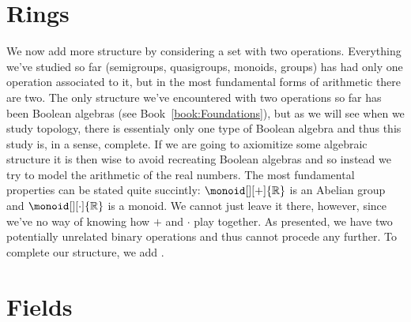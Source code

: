 \begingroup
    \ifcsname\PATH\endcsname
        \newcommand{\PATH}{books/Algebra/Ring_Theory}
        \newcommand{\OLDPATH}{\PATH}
    \else
        \newcommand{\OLDPATH}{\PATH}
        \renewcommand{\PATH}{books/Algebra/Ring_Theory}
    \fi
    \chapter{Rings}
        We now add more structure by considering a set with two operations.
        Everything we've studied so far (semigroups, quasigroups, monoids,
        groups) has had only one operation associated to it, but in the most
        fundamental forms of arithmetic there are two. The only structure we've
        encountered with two operations so far has been Boolean algebras
        (see Book~\ref{book:Foundations}), but as we will see when we study
        topology, there is essentialy only one type of Boolean algebra and thus
        this study is, in a sense, complete. If we are going to axiomitize some
        algebraic structure it is then wise to avoid recreating Boolean algebras
        and so instead we try to model the arithmetic of the real numbers. The
        most fundamental properties can be stated quite succintly:
        $\monoid[][+]{\mathbb{R}}$ is an Abelian group and
        $\monoid[][\cdot]{\mathbb{R}}$ is a monoid. We cannot just leave it
        there, however, since we've no way of knowing how $+$ and $\cdot$ play
        together. As presented, we have two potentially unrelated binary
        operations and thus cannot procede any further. To complete our
        structure, we add .
        
        
    \chapter{Fields}
        
    \renewcommand{\PATH}{\OLDPATH}

